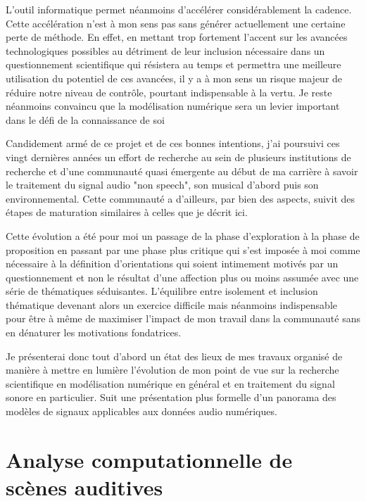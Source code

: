 L'outil informatique permet néanmoins d'accélérer considérablement la cadence. Cette accélération n'est à mon sens pas sans générer actuellement une certaine perte de méthode. En effet, en mettant trop fortement l'accent sur les avancées technologiques possibles au détriment de leur inclusion nécessaire dans un questionnement scientifique qui résistera au temps et permettra une meilleure utilisation du potentiel de ces avancées, il y a à mon sens un risque majeur de réduire notre niveau de contrôle, pourtant indispensable à la vertu. Je reste néanmoins convaincu que la modélisation numérique sera un levier important dans le défi de la connaissance de soi

Candidement armé de ce projet et de ces bonnes intentions, j'ai poursuivi ces vingt dernières années un effort de recherche au sein de plusieurs institutions de recherche et d'une communauté quasi émergente au début de ma carrière à savoir le traitement du signal audio "non speech", son musical d'abord puis son environnemental. Cette communauté a d'ailleurs, par bien des aspects, suivit des étapes de maturation similaires à celles que je décrit ici.

Cette évolution a été pour moi un passage de la phase d'exploration à la phase de proposition en passant par une phase plus critique qui s'est imposée à moi comme nécessaire à la définition d'orientations qui soient intimement motivés par un questionnement et non le résultat d'une affection plus ou moins assumée avec une série de thématiques séduisantes. L'équilibre entre isolement et inclusion thématique devenant alors un exercice difficile mais néanmoins indispensable pour être à même de maximiser l'impact de mon travail dans la communauté sans en dénaturer les motivations fondatrices.

Je présenterai donc tout d'abord un état des lieux de mes travaux organisé de manière à mettre en lumière l'évolution de mon point de vue sur la recherche scientifique en modélisation numérique en général et en traitement du signal sonore en particulier. Suit une présentation plus formelle d'un panorama des modèles de signaux applicables aux données audio numériques.


\section{Analyse computationnelle de scènes auditives}

